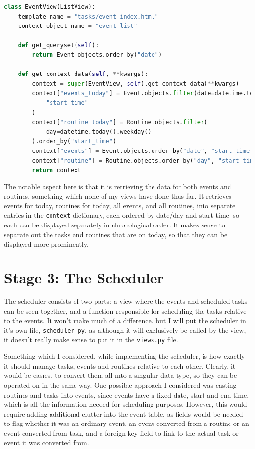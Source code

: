 \documentclass{article}
\begin{document}
\begin{lstlisting}[language=Python, breaklines]
class EventView(ListView):
    template_name = "tasks/event_index.html"
    context_object_name = "event_list"

    def get_queryset(self):
        return Event.objects.order_by("date")

    def get_context_data(self, **kwargs):
        context = super(EventView, self).get_context_data(**kwargs)
        context["events_today"] = Event.objects.filter(date=datetime.today()).order_by(
            "start_time"
        )
        context["routine_today"] = Routine.objects.filter(
            day=datetime.today().weekday()
        ).order_by("start_time")
        context["events"] = Event.objects.order_by("date", "start_time")
        context["routine"] = Routine.objects.order_by("day", "start_time")
        return context
\end{lstlisting}

The notable aspect here is that it is retrieving the data for both events and routines,
something which none of my views have done thus far.
It retrieves events for today,
routines for today,
all events,
and all routines,
into separate entries in the \texttt{context} dictionary,
each ordered by date/day and start time,
so each can be displayed separately in chronological order.
It makes sense to separate out the tasks and routines that are on today,
so that they can be displayed more prominently.

\section{Stage 3: The Scheduler}
The scheduler consists of two parts:
a view where the events and scheduled tasks can be seen together,
and a function responsible for scheduling the tasks relative to the events.
It won't make much of a difference,
but I will put the scheduler in it's own file,
\texttt{scheduler.py},
as although it will exclusively be called by the view,
it doesn't really make sense to put it in the \texttt{views.py} file.

Something which I considered,
while implementing the scheduler,
is how exactly it should manage tasks, events and routines relative to each other.
Clearly, it would be easiest to convert them all into a singular data type,
so they can be operated on in the same way.
One possible approach I considered was casting routines and tasks into events,
since events have a fixed date, start and end time,
which is all the information needed for scheduling purposes.
However, this would require adding additional clutter into the event table,
as fields would be needed to flag whether it was an ordinary event,
an event converted from a routine or an event converted from task,
and a foreign key field to link to the actual task or event it was converted from.
\end{document}
